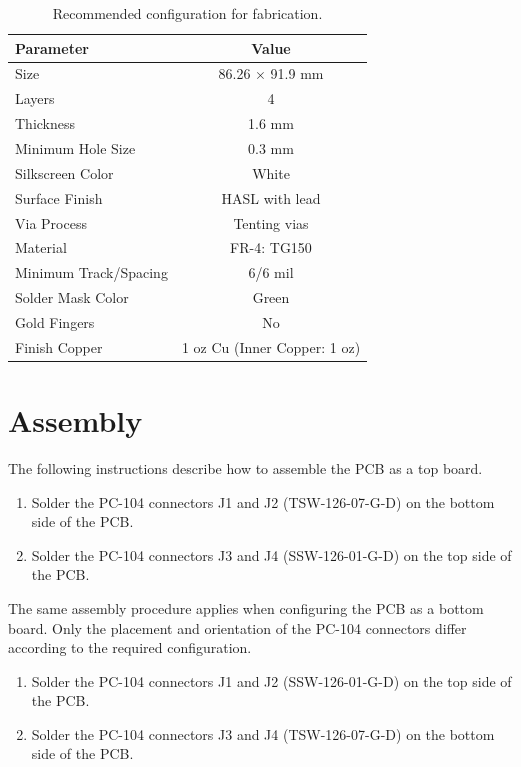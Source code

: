 \begin{table}[!h]
    \centering
    \begin{tabular}{lc}
        \toprule[1.5pt]
        \textbf{Parameter}      & \textbf{Value} \\
        \midrule
        Size                    & 86.26 $\times$ 91.9 mm \\
        Layers                  & 4 \\
        Thickness               & 1.6 mm \\
        Minimum Hole Size       & 0.3 mm \\
        Silkscreen Color        & White \\
        Surface Finish          & HASL with lead \\
        Via Process             & Tenting vias \\
        Material                & FR-4: TG150 \\
        Minimum Track/Spacing   & 6/6 mil \\
        Solder Mask Color       & Green \\
        Gold Fingers            & No \\
        Finish Copper           & 1 oz Cu (Inner Copper: 1 oz) \\
        \bottomrule[1.5pt]
    \end{tabular}
    \caption{Recommended configuration for fabrication.}
    \label{tab:pcb-fabrication}
\end{table}

\section{Assembly}

The following instructions describe how to assemble the PCB as a top board.

\begin{enumerate}
    \item Solder the PC-104 connectors J1 and J2 (TSW-126-07-G-D) on the bottom side of the PCB.
    \item Solder the PC-104 connectors J3 and J4 (SSW-126-01-G-D) on the top side of the PCB.
\end{enumerate}

The same assembly procedure applies when configuring the PCB as a bottom board. Only the placement and orientation of the PC-104 connectors differ according to the required configuration.

\begin{enumerate}
    \item Solder the PC-104 connectors J1 and J2 (SSW-126-01-G-D) on the top side of the PCB.
    \item Solder the PC-104 connectors J3 and J4 (TSW-126-07-G-D) on the bottom side of the PCB.
\end{enumerate}

